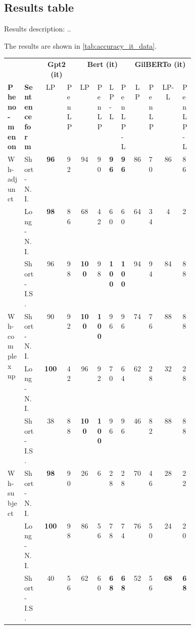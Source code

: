 \subsection{Results table}

Results description: ..

The results are shown in \autoref{tab:accuracy_it_data}.


\begin{table} \scriptsize 
	\begin{center}
		\begin{tabular}{p{0.095\linewidth}|p{0.099\linewidth}|c|p{0.04\linewidth}|c|p{0.04\linewidth}|p{0.04\linewidth}|p{0.04\linewidth}|c|p{0.04\linewidth}|c|p{0.04\linewidth}|}
			  &  & \multicolumn{2}{c|}{\textbf{Gpt2 (it)}} & \multicolumn{4}{c|}{\textbf{Bert (it)}}  & \multicolumn{4}{c|}{\textbf{GilBERTo (it)}} \\
			 \textbf{Pheno-menon} & \textbf{Sentence form} & LP & Pen LP & LP & Pen LP & LP-L & Pen LP-L & LP & Pen LP & LP-L & Pen LP-L \\
			\hline
			\multirow{3}{0.8cm}{Wh-adjunct}  
						& Short-N.I. & \textbf{96} & 92 & 94 & 90 & \textbf{96} & \textbf{96} & 86 & 70 & 86 & 86 \\ 
					   	& Long-N.I. & \textbf{98} & 86 & 68 & 42 & 60 & 60 & 64 & 34 & 4 & 2 \\ 
		  	 		    & Short-I.S. & 96 & 98 & \textbf{100} & 98 & \textbf{100} & \textbf{100} & 94 & 94 & 84 & 88 \\ 
		  	\hline
		  	\multirow{3}{0.8cm}{Wh-complex np} 
		  				& Short-N.I. & 90 & 92 & \textbf{100} & \textbf{100} & 96 & 96 & 74 & 76 & 88 & 88 \\ 
		  			  	& Long-N.I. & \textbf{100} & 42 & 96 & 92 & 70 & 64 & 62 & 28 & 32 & 28 \\ 
		  				& Short-I.S. & 38 & 88 & \textbf{100} & \textbf{100} & 96 & 96 & 46 & 82 & 88 & 88 \\ 		  			 
		  	\hline
		  	\multirow{3}{0.8cm}{Wh-subject} 
		  				& Short-N.I. & \textbf{98} & 90 & 26 & 6 & 28 & 28 & 70 & 46 & 28 & 22 \\ 
					  	& Long-N.I. & \textbf{100} & 98 & 86 & 56 & 78 & 74 & 76 & 50 & 24 & 20 \\ 
		  				& Short-I.S. & 40 & 56 & 62 & 60 & \textbf{68} & \textbf{68} & 52 & 56 & \textbf{68} & \textbf{68} \\ 
		  	\hline

\end{tabular}
\end{center}
\end{table}
